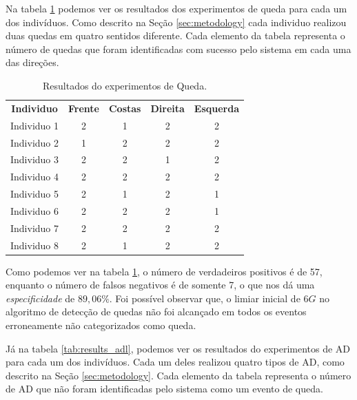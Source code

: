Na tabela \ref{tab:results_fall} podemos ver os resultados dos experimentos de queda para cada um dos indivíduos. Como descrito na Seção \ref{sec:metodology} cada individuo realizou duas quedas em quatro sentidos diferente. Cada elemento da tabela representa o número de quedas que foram identificadas com sucesso pelo sistema em cada uma das direções. 

\begin{table}[h]
	\centering
	\caption{Resultados do experimentos de Queda.}
	\label{tab:results_fall}
	\begin{tabular}{c|c|c|c|c}
		\hline
		\textbf{Individuo}  & \textbf{Frente} 	& \textbf{Costas}   &    \textbf{Direita}    & \textbf{Esquerda} 	 \\
		Individuo 1         & 2        		    & 1            		& 2      		 		 & 2         \\  
		Individuo 2         & 1        		    & 2            		& 2      		 		 & 2         \\
		Individuo 3         & 2        		    & 2            		& 1      		 		 & 2         \\
		Individuo 4         & 2        		    & 2            		& 2      		 		 & 2         \\
		Individuo 5         & 2        		    & 1            		& 2      		 		 & 1         \\
		Individuo 6         & 2        		    & 2            		& 2      		 		 & 1         \\
		Individuo 7         & 2        		    & 2            		& 2      		 		 & 2         \\
		Individuo 8         & 2        		    & 1            		& 2      		 		 & 2         \\
	\end{tabular}
\end{table}


Como podemos ver na tabela \ref{tab:results_fall}, o número de verdadeiros positivos é de 57, enquanto o número de falsos negativos é de somente 7, o que nos dá uma \textit{especificidade} de $89,06\%$. Foi possível observar que, o limiar inicial de $6G$ no algoritmo de detecção de quedas não foi alcançado em todos os eventos erroneamente não categorizados como queda.


Já na tabela \ref{tab:results_adl}, podemos ver os resultados do experimentos de \ac{AD} para cada um dos indivíduos. Cada um deles realizou quatro tipos de \ac{AD}, como descrito na Seção \ref{sec:metodology}. Cada elemento da tabela representa o número de \ac{AD} que não foram identificadas pelo sistema como um evento de queda. 


